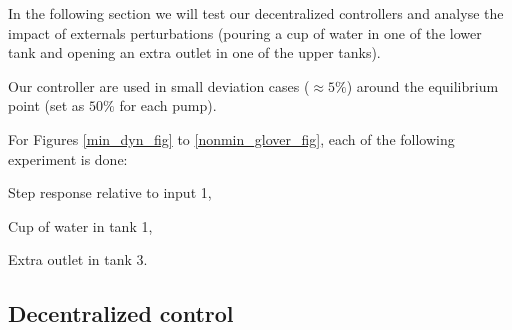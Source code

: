 In the following section we will test our decentralized controllers and analyse the impact of externals perturbations (pouring a cup of water in one of the lower tank and opening an extra outlet in one of the upper tanks).

Our controller are used in small deviation cases ($\approx 5\%$) around the equilibrium point (set as $50\%$ for each pump). 

For Figures \ref{min_dyn_fig} to \ref{nonmin_glover_fig}, each of the following experiment is done:
\begin{shortitemize}
    \item Step response relative to input 1,
    \item Cup of water in tank 1,
    \item Extra outlet in tank 3.
\end{shortitemize}
\subsection{Decentralized control}




